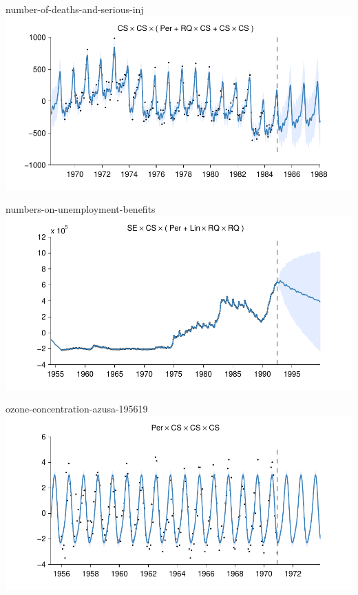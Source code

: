     
\begin{frame}{number-of-deaths-and-serious-inj}
  \center
  \includegraphics[width=1.0\textwidth]{figures/number-of-deaths-and-serious-inj/number-of-deaths-and-serious-inj_all}
\end{frame}  


    
\begin{frame}{numbers-on-unemployment-benefits}
  \center
  \includegraphics[width=1.0\textwidth]{figures/numbers-on-unemployment-benefits/numbers-on-unemployment-benefits_all}
\end{frame}  


    
\begin{frame}{ozone-concentration-azusa-195619}
  \center
  \includegraphics[width=1.0\textwidth]{figures/ozone-concentration-azusa-195619/ozone-concentration-azusa-195619_all}
\end{frame}  


